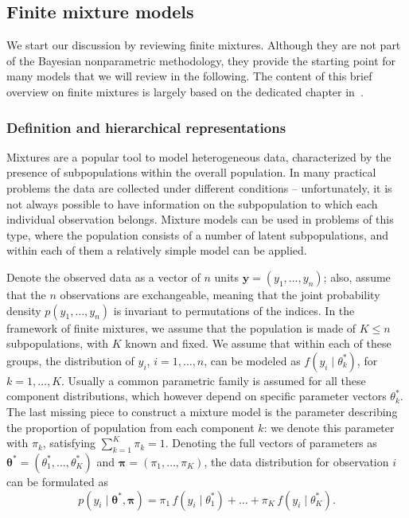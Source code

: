 \subsection{Finite mixture models}
\label{subsec:finite_mix}
We start our discussion by reviewing finite mixtures. Although they are not part of the Bayesian nonparametric methodology, they provide the starting point for many models that we will review in the following. The content of this brief overview on finite mixtures is largely based on the dedicated chapter in~\citet{gelman2013}.

\subsubsection*{Definition and hierarchical representations}
Mixtures are a popular tool to model heterogeneous data, characterized by the presence of subpopulations within the overall population. In many practical problems the data are collected under different conditions -- unfortunately, it is not always possible to have information on the subpopulation to which each individual observation belongs.
Mixture models can be used in problems of this type, where the population consists of a number of latent subpopulations, and within each of them a relatively simple model can be applied.

Denote the observed data as a vector of $n$ units $\bm{y} = (y_1,\dots,y_n)$; also, assume that the $n$ observations are exchangeable, meaning that the joint probability density $p(y_1,\dots,y_n)$ is invariant to permutations of the indices. In the framework of finite mixtures, we assume that the population is made of $K\leq n$ subpopulations, with $K$ known and fixed.
We assume that within each of these groups, the distribution of $y_i$, $i=1,\dots,n$, can be modeled as $f(y_i \mid \theta_k^*)$, for $k=1,\dots,K$. Usually a common parametric family is assumed for all these component distributions, which however depend on specific parameter vectors $\theta_k^*$.
The last missing piece to construct a mixture model is the parameter describing the proportion of population from each component $k$: we denote this parameter with $\pi_k$, satisfying $\sum_{k=1}^K \pi_k = 1$. Denoting the full vectors of parameters as $\bm{\theta}^* = (\theta_1^*,\dots,\theta_K^*)$ and $\bm{\pi} = (\pi_1,\dots,\pi_K)$, the data distribution for observation $i$ can be formulated as
\begin{equation*}
p(y_i\mid \bm{\theta}^*,\bm{\pi}) = \pi_1 \, f(y_i\mid\theta_1^*) + \dots + \pi_K \, f(y_i\mid\theta_K^*).
\end{equation*}


